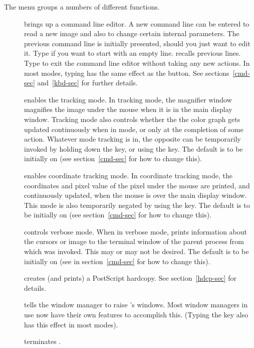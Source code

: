    The  menu groups a numbers of different functions.
\begin{description}
\item[] brings up a command line editor.  A new command line can
	be entered to read a new image and also to change certain internal
	parameters.  The previous command line is initially presented,
	should you just want to edit it.  Type  if you want
	to start with an empty line.   recalls previous lines.
	Type  to exit the command line editor without taking
	any new actions.  In most modes, typing
	 has the same effect as the  button.
	See sections~\ref{cmd-sec} and~\ref{kbd-sec} for further details.

\item[] enables the tracking mode.  In tracking mode, the magnifier
	window magnifies the image under the mouse when it is in the main
	display window.  Tracking mode also controls whether the the color
	graph gets updated continuously when in  mode, or only at
	the completion of some action.  Whatever mode tracking is in, the
	opposite can be temporarily invoked by holding down the  key,
	or using the  key.  The default is to be initially on
	(see section~\ref{cmd-sec} for how to change this).

\item[] enables coordinate tracking mode.  In coordinate tracking
	mode, the coordinates and pixel value of the pixel under the mouse
	are printed, and continuously updated, when the mouse is over the
	main display window.  This mode is also temporarily negated by
	using the  key.  The default is to be initially on (see
	section~\ref{cmd-sec} for how to change this).

\item[] controls verbose mode.  When in verbose mode, {\SAO}
	prints information about the cursors or image to the terminal
	window of the parent process from which {\SAO} was invoked.
	This may or may not be desired.  The default is to be initially
	on (see  in section~\ref{cmd-sec}
	for how to change this).

\item[] creates (and prints) a PostScript hardcopy.
	See section~\ref{hdcp-sec} for details.

\item[] tells the window manager to raise {\SAO}'s windows.
	Most window managers in use now have their own features to
	accomplish this.  (Typing the  key also has this effect in
	most modes).

\item[] terminates {\SAO}.
\end{description}

